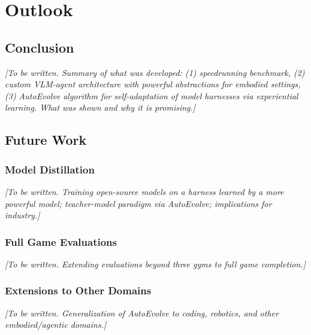
\newpage
\section{Outlook}\label{sec:outlook}

\subsection{Conclusion}\label{sec:conclusion}

\textit{[To be written. Summary of what was developed: (1) speedrunning benchmark, (2) custom VLM-agent architecture with powerful abstractions for embodied settings, (3) AutoEvolve algorithm for self-adaptation of model harnesses via experiential learning. What was shown and why it is promising.]}

\subsection{Future Work}\label{sec:future_work}


\subsubsection{Model Distillation}\label{sec:distillation}

\textit{[To be written. Training open-source models on a harness learned by a more powerful model; teacher-model paradigm via AutoEvolve; implications for industry.]}

\subsubsection{Full Game Evaluations}\label{sec:full_game}

\textit{[To be written. Extending evaluations beyond three gyms to full game completion.]}

\subsubsection{Extensions to Other Domains}\label{sec:extensions}

\textit{[To be written. Generalization of AutoEvolve to coding, robotics, and other embodied/agentic domains.]}
